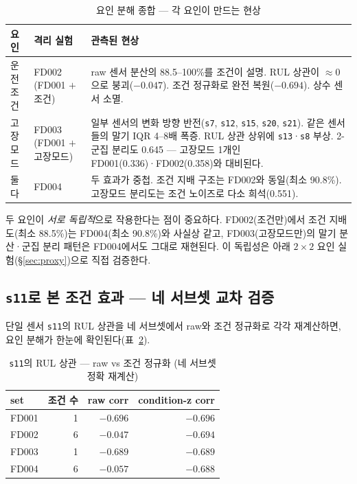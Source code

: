 \documentclass[11pt]{article}
\begin{document}
\begin{table}[H]
\centering
\caption{요인 분해 종합 — 각 요인이 만드는 현상}
\label{tab:factor}
\begin{tabular}{p{2.4cm}p{5.4cm}p{5.6cm}}
\toprule
요인 & 격리 실험 & 관측된 현상 \\
\midrule
운전조건 & FD002 (FD001 $+$ 조건) &
raw 센서 분산의 88.5--100\%를 조건이 설명. RUL 상관이 $\approx0$으로 붕괴($-0.047$). 조건 정규화로 완전 복원($-0.694$). 상수 센서 소멸. \\
\addlinespace
고장모드 & FD003 (FD001 $+$ 고장모드) &
일부 센서의 변화 방향 반전(\texttt{s7}, \texttt{s12}, \texttt{s15}, \texttt{s20}, \texttt{s21}). 같은 센서들의 말기 IQR 4--8배 폭증. RUL 상관 상위에 \texttt{s13}·\texttt{s8} 부상. 2-군집 분리도 0.645 — 고장모드 1개인 FD001(0.336)·FD002(0.358)와 대비된다. \\
\addlinespace
둘 다 & FD004 &
두 효과가 중첩. 조건 지배 구조는 FD002와 동일(최소 90.8\%). 고장모드 분리도는 조건 노이즈로 다소 희석(0.551). \\
\bottomrule
\end{tabular}
\end{table}

두 요인이 \emph{서로 독립적}으로 작용한다는 점이 중요하다.
FD002(조건만)에서 조건 지배도(최소 88.5\%)는 FD004(최소 90.8\%)와 사실상 같고,
FD003(고장모드만)의 말기 분산·군집 분리 패턴은 FD004에서도 그대로 재현된다.
이 독립성은 아래 $2\times2$ 요인 실험(\S\ref{sec:proxy})으로 직접 검증한다.

\subsection{\texttt{s11}로 본 조건 효과 — 네 서브셋 교차 검증}

단일 센서 \texttt{s11}의 RUL 상관을 네 서브셋에서 raw와 조건 정규화로 각각 재계산하면, 요인 분해가 한눈에 확인된다(표~\ref{tab:s11cross}).

\begin{table}[H]
\centering
\caption{\texttt{s11}의 RUL 상관 — raw vs 조건 정규화 (네 서브셋 정확 재계산)}
\label{tab:s11cross}
\begin{tabular}{lrrr}
\toprule
set & 조건 수 & raw corr & condition-z corr \\
\midrule
FD001 & 1 & $-0.696$ & $-0.696$ \\
FD002 & 6 & $-0.047$ & $-0.694$ \\
FD003 & 1 & $-0.689$ & $-0.689$ \\
FD004 & 6 & $-0.057$ & $-0.688$ \\
\bottomrule
\end{tabular}
\end{table}
\end{document}
